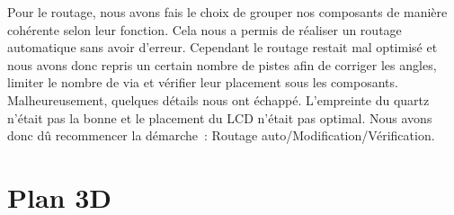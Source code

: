         Pour le routage, nous avons fais le choix de grouper nos composants de manière cohérente selon leur fonction. Cela nous a permis de réaliser un routage automatique sans avoir d’erreur. 
        Cependant le routage restait mal optimisé et nous avons donc repris un certain nombre de pistes afin de corriger les angles, limiter le nombre de via et vérifier leur placement sous les composants. \\
        Malheureusement, quelques détails nous ont échappé. L’empreinte du quartz n’était pas la bonne et le placement du LCD n’était pas optimal. Nous avons donc dû recommencer la démarche~: Routage auto/Modification/Vérification.  



    \section{Plan 3D}

